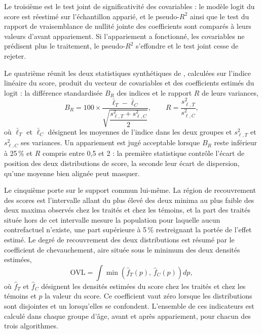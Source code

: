 Le troisième est le test joint de significativité des covariables : le
modèle logit du score est réestimé sur l'échantillon apparié, et le
pseudo-$R^2$ ainsi que le test du rapport de vraisemblance de nullité
jointe des coefficients sont comparés à leurs valeurs d'avant appariement.
Si l'appariement a fonctionné, les covariables ne prédisent plus le
traitement, le pseudo-$R^2$ s'effondre et le test joint cesse de rejeter.

Le quatrième réunit les deux statistiques synthétiques de
\textcite{rubin2001}, calculées sur l'indice linéaire du score, produit
du vecteur de covariables et des coefficients estimés du logit : la
différence standardisée $B_R$ des indices et le rapport $R$ de leurs
variances,
\begin{equation}
  B_R = 100 \times \frac{\bar{\ell}_T - \bar{\ell}_C}
        {\sqrt{\dfrac{s_{\ell,T}^2 + s_{\ell,C}^2}{2}}},
  \qquad
  R = \frac{s_{\ell,T}^2}{s_{\ell,C}^2},
  \label{eq:rubin}
\end{equation}
où $\bar{\ell}_T$ et $\bar{\ell}_C$ désignent les moyennes de l'indice dans
les deux groupes et $s_{\ell,T}^2$ et $s_{\ell,C}^2$ ses variances. Un
appariement est jugé acceptable lorsque $B_R$ reste inférieur à 25\,\% et
$R$ compris entre 0,5 et 2 : la première statistique contrôle l'écart de
position des deux distributions de score, la seconde leur écart de
dispersion, qu'une moyenne bien alignée peut masquer.

Le cinquième porte sur le support commun lui-même. La région de
recouvrement des scores est l'intervalle allant du plus élevé des deux
minima au plus faible des deux maxima observés chez les traités et chez
les témoins, et la part
des traités située hors de cet intervalle mesure la population pour
laquelle aucun contrefactuel n'existe, une part supérieure à 5\,\%
restreignant la portée de l'effet estimé. Le degré de recouvrement des
deux distributions est résumé par le coefficient de chevauchement, aire
située sous le minimum des deux densités estimées,
\begin{equation}
  \mathrm{OVL} = \int \min\left(\hat{f}_T(p),\, \hat{f}_C(p)\right) dp,
  \label{eq:ovl}
\end{equation}
où $\hat{f}_T$ et $\hat{f}_C$ désignent les densités estimées du score
chez les traités et chez les témoins et $p$ la valeur du score. Ce
coefficient vaut zéro lorsque les distributions sont disjointes et un
lorsqu'elles se confondent. L'ensemble de ces indicateurs est calculé dans
chaque groupe d'âge, avant et après appariement, pour chacun des trois
algorithmes.

